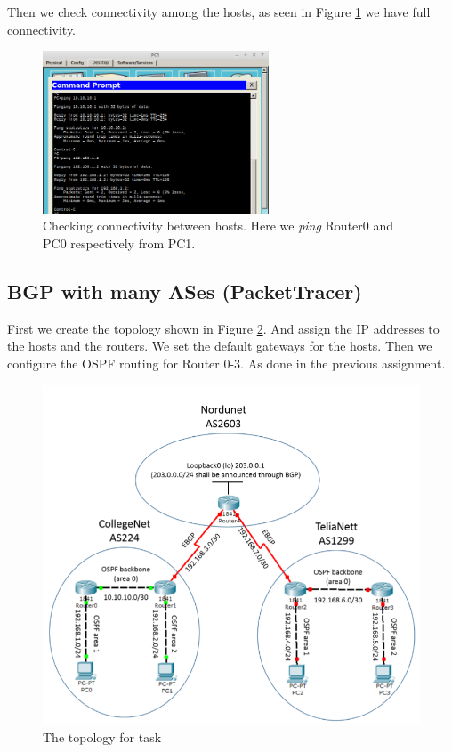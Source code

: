 \documentclass{article}
\begin{document}
Then we check connectivity among the hosts, as seen in Figure \ref{fig:4ping} we have full connectivity. 

\begin{figure}
    \centering
    \includegraphics[width=0.6\textwidth]{4ping}
    \caption{Checking connectivity between hosts. Here we \textit{ping} Router0 and PC0 respectively from PC1. }
    \label{fig:4ping}
\end{figure}

\subsection{BGP with many ASes (PacketTracer)}

First we create the topology shown in Figure \ref{fig:5topo}. And assign the IP addresses to the hosts and the routers. We set the default gateways for the hosts. Then we configure the OSPF routing for Router 0-3. As done in the previous assignment. 

\begin{figure}[h]
    \centering
    \includegraphics[width=\textwidth]{5topo}
    \caption{The topology for task}
    \label{fig:5topo}
\end{figure}
\end{document}
